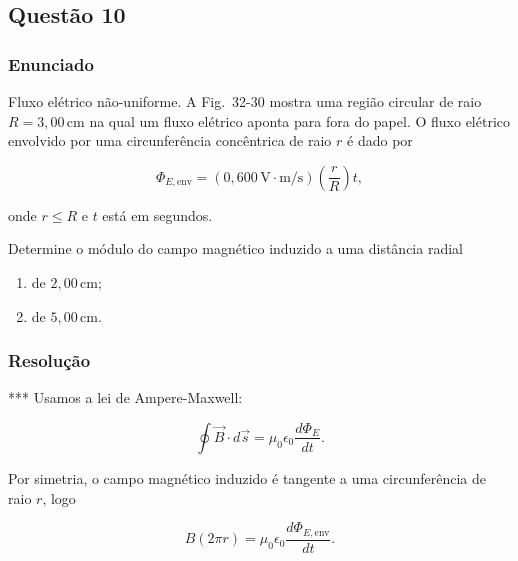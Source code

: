 \subsection{Questão 10}

\subsubsection{Enunciado}

Fluxo elétrico não-uniforme. A Fig.~32-30 mostra uma região circular de raio 
\(R = 3{,}00\,\text{cm}\) na qual um fluxo elétrico aponta para fora do papel. 
O fluxo elétrico envolvido por uma circunferência concêntrica de raio \(r\) é dado por

\[
\Phi_{E,\text{env}} = \left(0{,}600\,\text{V}\cdot\text{m/s}\right)\left(\frac{r}{R}\right)t,
\]

onde \(r \leq R\) e \(t\) está em segundos.

Determine o módulo do campo magnético induzido a uma distância radial

\begin{enumerate}
    \item[(a)] de \(2{,}00\,\text{cm}\);
    
    \item[(b)] de \(5{,}00\,\text{cm}\).
\end{enumerate}


\subsubsection{Resolução}

***
Usamos a lei de Ampere-Maxwell:

\[
\oint \vec{B}\cdot d\vec{s}
=
\mu_0\epsilon_0\frac{d\Phi_E}{dt}.
\]

Por simetria, o campo magnético induzido é tangente a uma circunferência de
raio \(r\), logo

\[
B(2\pi r)=\mu_0\epsilon_0\frac{d\Phi_{E,\text{env}}}{dt}.
\]

